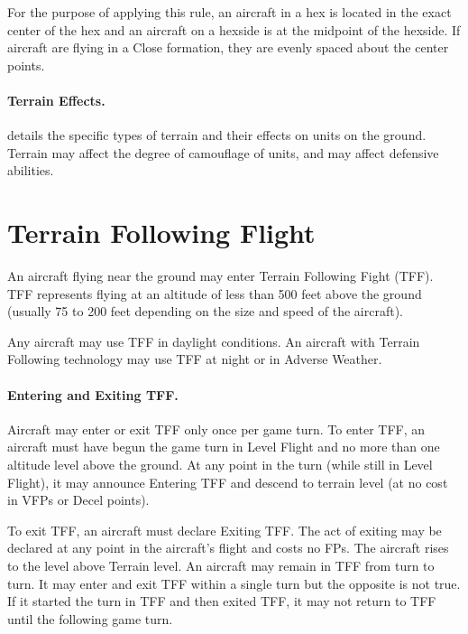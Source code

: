 For the purpose of applying this rule, an aircraft in a hex is located in the exact center of the hex and an aircraft on a hexside is at the midpoint of the hexside. If aircraft are flying in a Close formation, they are evenly spaced about the center points.


\paragraph{Terrain Effects\protect{}.}  details the specific types of terrain and their effects on units on the ground. Terrain may affect the degree of camouflage of units, and may affect defensive abilities.

\section{Terrain Following Flight}

An aircraft flying near the ground may enter Terrain Following Fight (TFF). TFF represents flying at an altitude of less than 500 feet above the ground (usually 75 to 200 feet depending on the size and speed of the aircraft).

Any aircraft may use TFF in daylight conditions. An aircraft with Terrain Following technology may use TFF at night or in Adverse Weather.

\paragraph{Entering and Exiting TFF.} Aircraft may enter or exit TFF only once per game turn. To enter TFF, an aircraft must have begun the game turn in Level Flight and no more than one altitude level above the ground. At any point in the turn (while still in Level Flight), it may announce Entering TFF and descend to terrain level (at no cost in VFPs or Decel points).

To exit TFF, an aircraft must declare Exiting TFF. The act of exiting may be declared at any point in the aircraft's flight and costs no FPs. The aircraft rises to the level above Terrain level. An aircraft may remain in TFF from turn to turn. It may enter and exit TFF within a single turn but the opposite is not true.  If it started the turn in TFF and then exited TFF, it may not return to TFF until the following game turn. 

